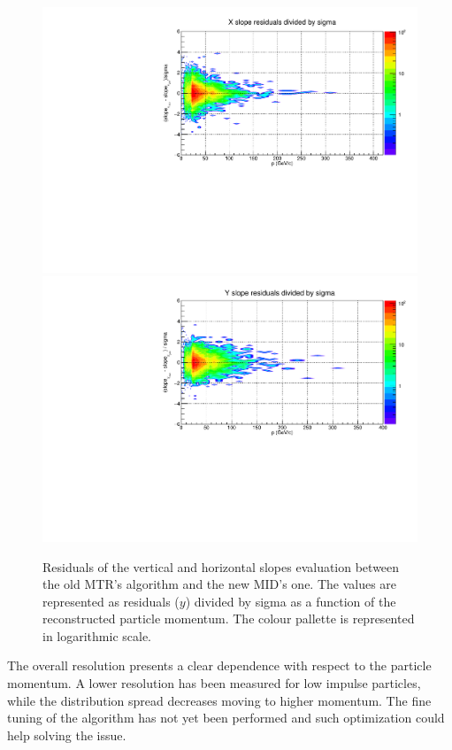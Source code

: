 \begin{figure}[!h]
\begin{center}
\includegraphics[width=0.99\linewidth]{Chapters/O2/Figs/TRmx_sigma.pdf}
\includegraphics[width=0.99\linewidth]{Chapters/O2/Figs/TRmy_sigma.pdf}
\caption{Residuals of the vertical and horizontal slopes evaluation between the old MTR's algorithm and the new MID's one. The values are represented as residuals ($y$) divided by sigma as a function of the reconstructed particle momentum. The colour pallette is represented in logarithmic scale.}
\label{fig:MID_TRm}
\end{center}
\end{figure}

The overall resolution presents a clear dependence with respect to the particle momentum.
A lower resolution has been measured for low impulse particles, while the distribution spread decreases moving to higher momentum.
The fine tuning of the algorithm has not yet been performed and such optimization could help solving the issue.

